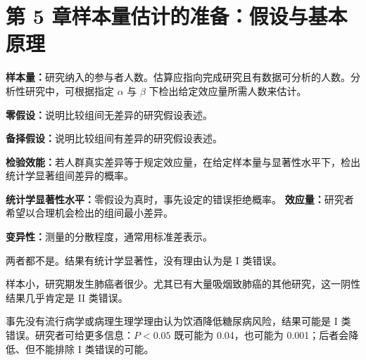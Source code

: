 \section{第 5 章\quad 样本量估计的准备：假设与基本原理}
\begin{answerlist}
\item[1.] \textbf{样本量：}研究纳入的参与者人数。估算应指向完成研究且有数据可分析的人数。分析性研究中，可根据指定 $\alpha$ 与 $\beta$ 下检出给定效应量所需人数来估计。

\textbf{零假设：}说明比较组间无差异的研究假设表述。

\textbf{备择假设：}说明比较组间有差异的研究假设表述。

\textbf{检验效能：}若人群真实差异等于规定效应量，在给定样本量与显著性水平下，检出统计学显著组间差异的概率。

\textbf{统计学显著性水平：}零假设为真时，事先设定的错误拒绝概率。
\textbf{效应量：}研究者希望以合理机会检出的组间最小差异。

\textbf{变异性：}测量的分散程度，通常用标准差表示。
\item[2a.] 两者都不是。结果有统计学显著性，没有理由认为是 I 类错误。
\item[2b.] 样本小，研究期发生肺癌者很少。尤其已有大量吸烟致肺癌的其他研究，这一阴性结果几乎肯定是 II 类错误。
\item[2c.] 事先没有流行病学或病理生理学理由认为饮酒降低糖尿病风险，结果可能是 I 类错误。研究者可给更多信息：$P<0.05$ 既可能为 0.04，也可能为 0.001；后者会降低、但不能排除 I 类错误的可能。
\end{answerlist}

